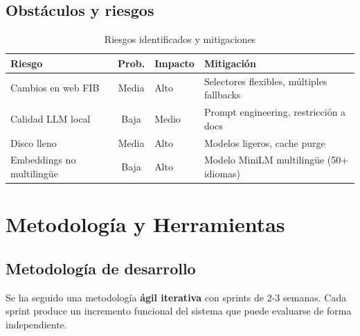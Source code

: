 \documentclass[12pt, a4paper, twoside]{report}
\begin{document}
\section{Obst\'aculos y riesgos}

\begin{table}[H]
\centering
\caption{Riesgos identificados y mitigaciones}
\label{tab:riesgos}
\begin{tabularx}{\textwidth}{lclX}
\toprule
\textbf{Riesgo} & \textbf{Prob.} & \textbf{Impacto} & \textbf{Mitigaci\'on} \\
\midrule
Cambios en web FIB & Media & Alto & Selectores flexibles, m\'ultiples fallbacks \\
Calidad LLM local & Baja & Medio & Prompt engineering, restricci\'on a docs \\
Disco lleno & Media & Alto & Modelos ligeros, cache purge \\
Embeddings no multiling\"ue & Baja & Alto & Modelo MiniLM multiling\"ue (50+ idiomas) \\
\bottomrule
\end{tabularx}
\end{table}


\chapter{Metodolog\'ia y Herramientas}
\label{ch:metodologia}

\section{Metodolog\'ia de desarrollo}

Se ha seguido una metodolog\'ia \textbf{\'agil iterativa} con sprints de 2-3 semanas. Cada sprint produce un incremento funcional del sistema que puede evaluarse de forma independiente.
\end{document}
